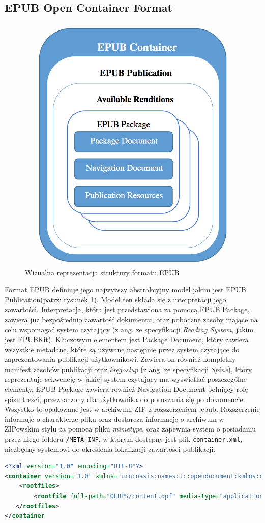 \subsection{EPUB Open Container Format}

\begin{figure}[ht!]
  \centering
  \includegraphics[width=.4\linewidth]{images/chapter-3-image-1-structure.png}
  \caption{Wizualna reprezentacja struktury formatu EPUB\cite{EPUBSpecification}}
  \label{fig:epubspec}
\end{figure}

Format EPUB definiuje jego najwyższy abstrakcyjny model jakim jest EPUB Publication(patrz: rysunek \ref{fig:epubspec}). Model ten składa się z interpretacji jego zawartości. Interpretacja, która jest przedstawiona za pomocą EPUB Package, zawiera już bezpośrednio zawartość dokumentu, oraz poboczne zasoby mające na celu wspomagać system czytający (z ang. ze specyfikacji \textit{Reading System}, jakim jest EPUBKit). Kluczowym elementem jest Package Document, który zawiera wszystkie metadane, które są używane następnie przez system czytające do zaprezentowania publikacji użytkownikowi. Zawiera on również kompletny manifest zasobów publikacji oraz \textit{kręgosłup} (z ang. ze specyfikacji \textit{Spine}), który reprezentuje sekwencję w jakiej system czytający ma wyświetlać poszczególne elementy. EPUB Package zawiera również Navigation Document pełniący rolę spisu treści, przeznaczony dla użytkownika do poruszania się po dokumencie. Wszystko to opakowane jest w archiwum ZIP z rozszerzeniem .epub. Rozszerzenie informuje o charakterze pliku oraz dostarcza informację o archiwum w ZIPowskim stylu za pomocą pliku \textit{mimetype}, oraz zapewnia system o posiadaniu przez niego folderu \texttt{/META-INF}, w którym dostępny jest plik \texttt{container.xml}, niezbędny systemowi do określenia lokalizacji zawartości publikacji.

\begin{lstlisting}[caption={Przykładowy plik container.xml}, language=XML,label=container-xml]
<?xml version="1.0" encoding="UTF-8"?>
<container version="1.0" xmlns="urn:oasis:names:tc:opendocument:xmlns:container">
    <rootfiles>
        <rootfile full-path="OEBPS/content.opf" media-type="application/oebps-package+xml"/>
   </rootfiles>
</container
\end{lstlisting}

